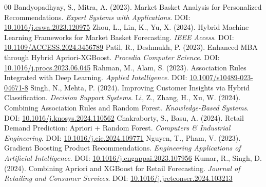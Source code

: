 \documentclass[twocolumn]{article}
\begin{document}
\begin{thebibliography}{00}
 Bandyopadhyay, S., Mitra, A. (2023). Market Basket Analysis for Personalized Recommendations. \textit{Expert Systems with Applications}. DOI: \href{https://doi.org/10.1016/j.eswa.2023.120975}{10.1016/j.eswa.2023.120975}
 Zhou, L., Lin, K., Yu, X. (2024). Hybrid Machine Learning Frameworks for Market Basket Forecasting. \textit{IEEE Access}. DOI: \href{https://doi.org/10.1109/ACCESS.2024.3456789}{10.1109/ACCESS.2024.3456789}
 Patil, R., Deshmukh, P. (2023). Enhanced MBA through Hybrid Apriori-XGBoost. \textit{Procedia Computer Science}. DOI: \href{https://doi.org/10.1016/j.procs.2023.06.045}{10.1016/j.procs.2023.06.045}
 Rahman, M., Alam, S. (2023). Association Rules Integrated with Deep Learning. \textit{Applied Intelligence}. DOI: \href{https://doi.org/10.1007/s10489-023-04671-8}{10.1007/s10489-023-04671-8}
 Singh, N., Mehta, P. (2024). Improving Customer Insights via Hybrid Classification. \textit{Decision Support Systems}.
 Li, Z., Zhang, H., Xu, W. (2024). Combining Association Rules and Random Forest. \textit{Knowledge-Based Systems}. DOI: \href{https://doi.org/10.1016/j.knosys.2024.110562}{10.1016/j.knosys.2024.110562}
 Chakraborty, S., Basu, A. (2024). Retail Demand Prediction: Apriori + Random Forest. \textit{Computers \& Industrial Engineering}. DOI: \href{https://doi.org/10.1016/j.cie.2024.109771}{10.1016/j.cie.2024.109771}
 Nguyen, T., Pham, V. (2023). Gradient Boosting Product Recommendations. \textit{Engineering Applications of Artificial Intelligence}. DOI: \href{https://doi.org/10.1016/j.engappai.2023.107956}{10.1016/j.engappai.2023.107956}
 Kumar, R., Singh, D. (2024). Combining Apriori and XGBoost for Retail Forecasting. \textit{Journal of Retailing and Consumer Services}. DOI: \href{https://doi.org/10.1016/j.jretconser.2024.103213}{10.1016/j.jretconser.2024.103213}
\end{thebibliography}
\end{document}
